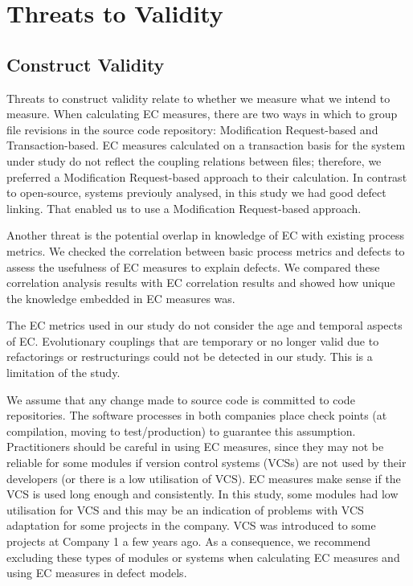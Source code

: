 \documentclass[times]{smrauth}
\begin{document}

\section{Threats to Validity}

\subsection{Construct Validity}

Threats to construct validity relate to whether we measure what we intend to measure. When calculating EC measures, there are two ways in which to group file revisions in the source code repository: Modification Request-based and Transaction-based. EC measures calculated on a transaction basis for the system under study do not reflect the coupling relations between files; therefore, we preferred a Modification Request-based approach to their calculation. In contrast to open-source, systems previouly analysed, in this study we had good defect linking. That enabled us to use a Modification Request-based approach. 

Another threat is the potential overlap in knowledge of EC with existing process metrics. We checked the correlation between basic process metrics and defects to assess the usefulness of EC measures to explain defects. We compared these correlation analysis results with EC correlation results and showed how unique the knowledge embedded in EC measures was.

The EC metrics used in our study do not consider the age and temporal aspects of EC. Evolutionary couplings that are temporary or no longer valid due to refactorings or restructurings could not be detected in our study. This is a limitation of the study.

We assume that any change made to source code is committed to code repositories. The software processes in both companies place check points (at compilation, moving to test/production) to guarantee this assumption. Practitioners should be careful in using EC measures, since they may not be reliable for some modules if version control systems (VCSs) are not used by their developers (or there is a low utilisation of VCS). EC measures make sense if the VCS is used long enough and consistently. In this study, some modules had low utilisation for VCS and this may be an indication of problems with VCS adaptation for some projects in the company. VCS was introduced to some projects at Company 1 a few years ago. As a consequence, we recommend excluding these types of modules or systems when calculating EC measures and using EC measures in defect models.
\end{document}
